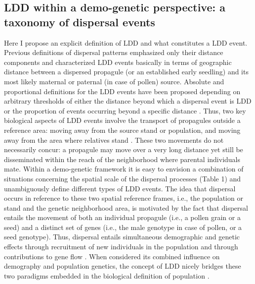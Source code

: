 \documentclass[a4paper, 12pt]{article}
\begin{document}
\begin{linenumbers}
\subsection*{LDD within a demo-genetic perspective: a taxonomy of dispersal events}

Here I propose an explicit definition of LDD and what constitutes a LDD event. Previous definitions of dispersal patterns emphasized only their distance components and characterized LDD events basically in terms of geographic distance between a dispersed propagule (or an established early seedling) and its most likely maternal or paternal (in case of pollen) source. Absolute and proportional definitions for the LDD events have been proposed depending on arbitrary thresholds of either the distance beyond which a dispersal event is LDD or the proportion of events occurring beyond a specific distance \citep{Nathan:2005jc, Nathan:2008is}. Thus, two key biological aspects of LDD events involve the transport of propagules outside a reference area: moving away from the source stand or population, and moving away from the area where relatives stand \citep{Kinlan:2005fb}. These two movements do not necessarily concur: a propagule may move over a very long distance yet still be disseminated within the reach of the neighborhood where parental individuals mate. Within a demo-genetic framework it is easy to envision a combination of situations concerning the spatial scale of the dispersal processes (Table 1) and unambiguously define different types of LDD events. The idea that dispersal occurs in reference to these two spatial reference frames, i.e., the population or stand and the genetic neighborhood area, is motivated by the fact that dispersal entails the movement of both an individual propagule (i.e., a pollen grain or a seed) and a distinct set of genes (i.e., the male genotype in case of pollen, or a seed genotype). Thus, dispersal entails simultaneous demographic and genetic effects through recruitment of new individuals in the population and through contributions to gene flow \citep{Harper:1977aa}. When considered its combined influence on demography and population genetics, the concept of LDD nicely bridges these two paradigms embedded in the biological definition of population \citep{Waples:2006ev}. 
 

\end{linenumbers}
\end{document}

